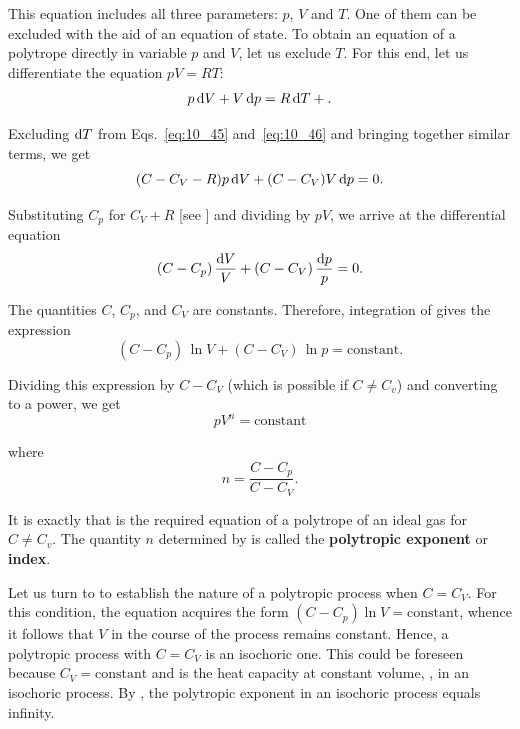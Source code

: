 \noindent
This equation includes all three parameters: $p$, $V$ and $T$. One of them can be excluded with the aid of an equation of state. To obtain an equation of a polytrope directly in variable $p$ and $V$, let us exclude $T$. For this end, let us differentiate the equation $pV=RT$:
\begin{equation}\label{eq:10_46}
	p\,\mathrm{d} V + V\,\mathrm{d} p = R\,\mathrm{d} T + .
\end{equation}

\noindent
Excluding $\mathrm{d} T$ from Eqs.~\eqref{eq:10_45} and~\eqref{eq:10_46} and bringing together similar terms, we get
\begin{equation}\label{eq:10_47}
	(C - C_V - R) p\,\mathrm{d} V + (C - C_V) V\,\mathrm{d} p = 0.
\end{equation}

\noindent
Substituting $C_p$ for $C_V+R$ [see ] and dividing  by $pV$, we arrive at the differential equation
\begin{equation}\label{eq:10_48}
	(C - C_p)\,\frac{\mathrm{d} V}{V} + (C - C_V) \,\frac{\mathrm{d} p}{p} = 0.
\end{equation}

The quantities $C$, $C_p$, and $C_V$ are constants. Therefore, integration of  gives the expression
\begin{equation}\label{eq:10_49}
	(C - C_p)\,\ln{V} + (C - C_V)\,\ln{p} = \text{constant}.
\end{equation}

\noindent
Dividing this expression by $C-C_V$ (which is possible if $C\neq C_v$) and converting to a power, we get
\begin{equation}\label{eq:10_50}
	pV^n = \text{constant}
\end{equation}

\noindent
where
\begin{equation}\label{eq:10_51}
	n = \frac{C - C_p}{C - C_V}.
\end{equation}

It is exactly  that is the required equation of a polytrope of an ideal gas for $C\neq C_v$. The quantity $n$ determined by  is called the \textbf{polytropic exponent} or \textbf{index}.

Let us turn to  to establish the nature of a polytropic process when $C=C_V$. For this condition, the equation acquires the form $(C-C_p)\ln{V}=\text{constant}$, whence it follows that $V$ in the course of the process remains constant. Hence, a polytropic process with $C=C_V$ is an isochoric one. This could be foreseen because $C_V=\text{constant}$ and is the heat capacity at constant volume, \ie, in	an isochoric process. By , the polytropic exponent in an isochoric process equals infinity.

